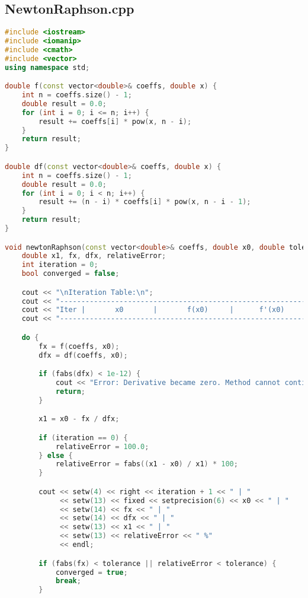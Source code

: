 \documentclass[12pt,a4paper]{article}
\begin{document}
\subsection{NewtonRaphson.cpp}
\begin{lstlisting}[language=C++, caption={Newton-Raphson Method for General Polynomials}, label={lst:newtonraphson}]
#include <iostream>
#include <iomanip>
#include <cmath>
#include <vector>
using namespace std;

double f(const vector<double>& coeffs, double x) {
    int n = coeffs.size() - 1;
    double result = 0.0;
    for (int i = 0; i <= n; i++) {
        result += coeffs[i] * pow(x, n - i);
    }
    return result;
}

double df(const vector<double>& coeffs, double x) {
    int n = coeffs.size() - 1;
    double result = 0.0;
    for (int i = 0; i < n; i++) {
        result += (n - i) * coeffs[i] * pow(x, n - i - 1);
    }
    return result;
}

void newtonRaphson(const vector<double>& coeffs, double x0, double tolerance, int maxIterations) {
    double x1, fx, dfx, relativeError;
    int iteration = 0;
    bool converged = false;

    cout << "\nIteration Table:\n";
    cout << "-----------------------------------------------------------------------------------------\n";
    cout << "Iter |       x0       |       f(x0)     |      f'(x0)     |       x1       | Relative Error\n";
    cout << "-----------------------------------------------------------------------------------------\n";

    do {
        fx = f(coeffs, x0);
        dfx = df(coeffs, x0);

        if (fabs(dfx) < 1e-12) {
            cout << "Error: Derivative became zero. Method cannot continue.\n";
            return;
        }

        x1 = x0 - fx / dfx;

        if (iteration == 0) {
            relativeError = 100.0;
        } else {
            relativeError = fabs((x1 - x0) / x1) * 100;
        }

        cout << setw(4) << right << iteration + 1 << " | "
             << setw(13) << fixed << setprecision(6) << x0 << " | "
             << setw(14) << fx << " | "
             << setw(14) << dfx << " | "
             << setw(13) << x1 << " | "
             << setw(13) << relativeError << " %"
             << endl;

        if (fabs(fx) < tolerance || relativeError < tolerance) {
            converged = true;
            break;
        }


\end{lstlisting}
\end{document}
